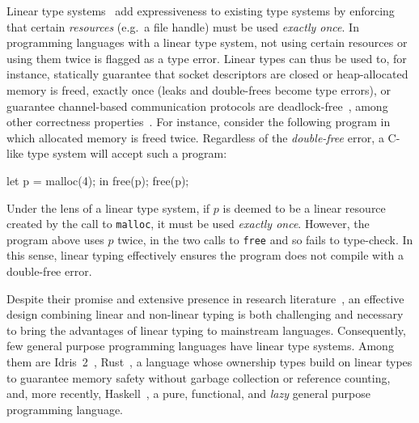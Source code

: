 \documentclass[acmsmall,review]{acmart}
\begin{document}
Linear type systems~\cite{cite:linear-logic,cite:barberdill} add expressiveness
to existing type systems by enforcing that certain \emph{resources} (e.g.~a
file handle) must be used \emph{exactly once}.
%
In programming languages with a linear type system, not using certain resources
or using them twice is flagged as a type error. Linear types can thus be used
to, for instance, statically guarantee that socket descriptors are closed or
heap-allocated memory is freed, exactly once (leaks and double-frees become
type errors), or guarantee channel-based communication protocols are
deadlock-free~\cite{10.1007/978-3-642-15375-4_16},
among other correctness properties~\cite{10.1145/3373718.3394765,10.1145/3527313,cite:linearhaskell}.
%
For instance, consider the following program in which allocated memory is freed twice.
Regardless of the \emph{double-free} error, a C-like type system will
accept such a program:
\begin{code}
let p = malloc(4); in free(p); free(p);
\end{code}
Under the lens of a linear type system, if $p$ is deemed to be a
linear resource created by the call to \texttt{malloc}, it
must be used \emph{exactly once}.  However, the program above uses $p$ twice,
in the two calls to \texttt{free} and so fails to type-check.
%
In this sense, linear typing
effectively ensures the program does not compile with a double-free error.

Despite their promise and extensive presence in research
literature~\cite{Wadler1990LinearTC,CERVESATO2000133,10.1093/logcom/2.3.297},
an effective design combining linear and non-linear typing is both
challenging and necessary to bring the advantages of linear typing to
mainstream languages.
%
Consequently, few general purpose programming languages have linear
type systems. Among them are Idris~2~\cite{brady:LIPIcs.ECOOP.2021.9},
Rust~\cite{10.1145/2692956.2663188}, a language whose
ownership types build on linear types to guarantee memory safety
without garbage collection or reference counting, and, more recently,
Haskell~\cite{cite:linearhaskell}, a pure, functional, and
\emph{lazy} general purpose programming language.
%
%
\end{document}

